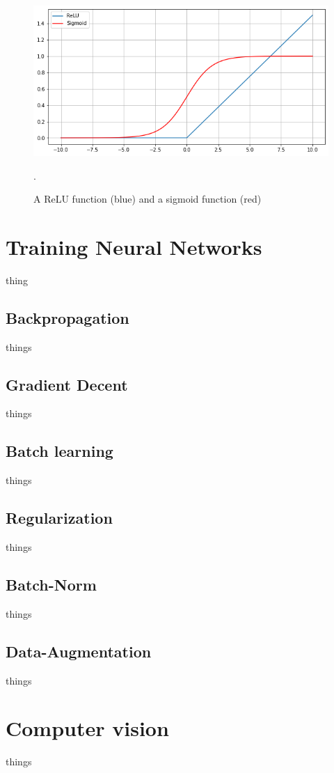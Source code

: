             \begin{figure}[H]
                \centering
                \includegraphics[scale=0.5]{figures/activation.png}
                \caption{A ReLU function (blue) and a sigmoid function (red)}.
              	\medskip 
                \label{activation_fig}
            \end{figure}

\section{Training Neural Networks} \label{training neural networks}
    thing
\subsection{Backpropagation}
    things
\subsection{Gradient Decent}
    things
\subsection{Batch learning}
    things
\subsection{Regularization}
    things
\subsection{Batch-Norm}
    things
\subsection{Data-Augmentation}
    things

\section{Computer vision}
    things
